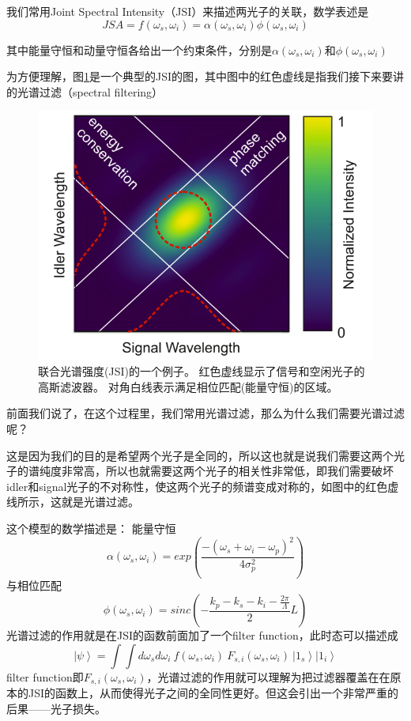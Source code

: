 我们常用Joint Spectral Intensity（JSI）来描述两光子的关联，数学表述是
\[JSA=f\left(\omega_s,\omega_i\right)=\alpha\left(\omega_s,\omega_i\right)\phi\left(\omega_s,\omega_i\right)\]

其中能量守恒和动量守恒各给出一个约束条件，分别是$\alpha\left(\omega_s,\omega_i\right)$和$\phi\left(\omega_s,\omega_i\right)$

为方便理解，图\ref{fig:JSI}是一个典型的JSI的图，其中图中的红色虚线是指我们接下来要讲的光谱过滤（spectral filtering）

\begin{figure}[ht]
	\centering
	\includegraphics[scale=0.6]{pic/JSI}
	\caption{联合光谱强度(JSI)的一个例子。
红色虚线显示了信号和空闲光子的高斯滤波器。
对角白线表示满足相位匹配(能量守恒)的区域。}
	\label{fig:JSI}
\end{figure}

前面我们说了，在这个过程里，我们常用光谱过滤，那么为什么我们需要光谱过滤呢？

这是因为我们的目的是希望两个光子是全同的，所以这也就是说我们需要这两个光子的谱纯度非常高，所以也就需要这两个光子的相关性非常低，即我们需要破坏idler和signal光子的不对称性，使这两个光子的频谱变成对称的，如图中的红色虚线所示，这就是光谱过滤。

这个模型的数学描述是：
能量守恒\[\alpha\left(\omega_s,\omega_i\right)=exp\left(\frac{-\left(\omega_s+\omega_i-\omega_p\right)^2}{4\sigma_p^2}\right)\]与相位匹配\[\phi\left(\omega_s,\omega_i\right)=sinc(-\frac{k_p-k_s-k_i-\frac{2\pi}{\Lambda}}{2}L)\]光谱过滤的作用就是在JSI的函数前面加了一个filter function，此时态可以描述成
\[\left|\psi\right\rangle=\int\int{d\omega_s}d\omega_i\ f\left(\omega_s,\omega_i\right)\ F_{s,i}\left(\omega_s,\omega_i\right)\ \left|1_s\right\rangle\left|1_i\right\rangle\]
filter function即$F_{s,i}\left(\omega_s,\omega_i\right)$，光谱过滤的作用就可以理解为把过滤器覆盖在在原本的JSI的函数上，从而使得光子之间的全同性更好。但这会引出一个非常严重的后果——光子损失。

